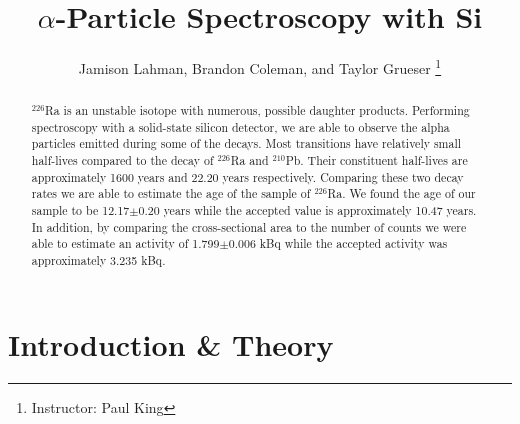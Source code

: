 \documentclass[10pt]{IEEEtran}
\begin{document}
    \title{$\alpha$-Particle Spectroscopy with Si}
    \author{Jamison Lahman, Brandon Coleman, and Taylor Grueser
    \thanks{Instructor: Paul King}}
    \maketitle

\begin{abstract}
$^{226}$Ra is an unstable isotope with numerous, possible daughter
products.
Performing spectroscopy with a solid-state silicon detector, we are able to observe the alpha particles emitted during some of the decays. Most transitions have relatively small half-lives compared to the decay of  $^{226}$Ra and $^{210}$Pb. Their constituent half-lives are approximately 1600 years and 22.20 years respectively. Comparing these two decay rates we are able to estimate the age of the sample of $^{226}$Ra. We found the age of our sample to be 12.17$\pm$0.20 years while the accepted value is approximately 10.47 years. In addition, by comparing the cross-sectional area to the number of counts we were able to estimate an activity of 1.799$\pm$0.006 kBq while the accepted activity was approximately 3.235 kBq.
\end{abstract}

\section{Introduction \& Theory}
\end{document}
